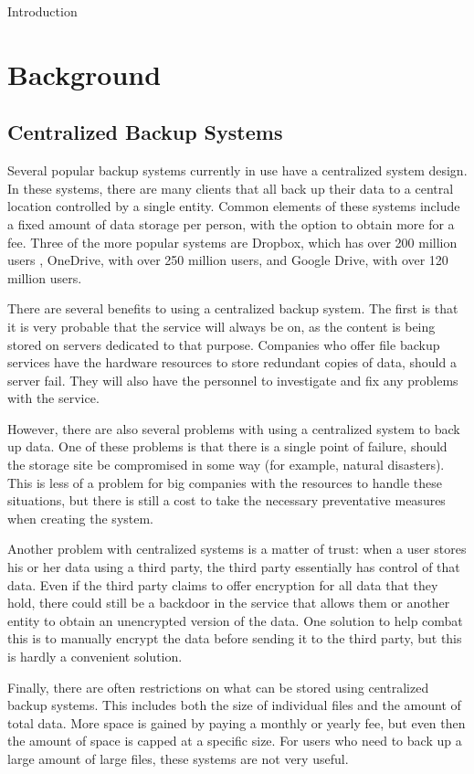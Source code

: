 \documentclass[12pt]{report}
\begin{document}
Introduction


\chapter{Background}
\section{Centralized Backup Systems}
Several popular backup systems currently in use have a centralized system design. In these systems, there are many clients that all back up their data to a central location controlled by a single entity. Common elements of these systems include a fixed amount of data storage per person, with the option to obtain more for a fee. Three of the more popular systems are Dropbox, which has over 200 million users \cite{dropboxusers}, OneDrive, with over 250 million users, and Google Drive, with over 120 million users.

There are several benefits to using a centralized backup system. The first is that it is very probable that the service will always be on, as the content is being stored on servers dedicated to that purpose. Companies who offer file backup services have the hardware resources to store redundant copies of data, should a server fail. They will also have the personnel to investigate and fix any problems with the service.

However, there are also several problems with using a centralized system to back up data. One of these problems is that there is a single point of failure, should the storage site be compromised in some way (for example, natural disasters). This is less of a problem for big companies with the resources to handle these situations, but there is still a cost to take the necessary preventative measures when creating the system.

Another problem with centralized systems is a matter of trust: when a user stores his or her data using a third party, the third party essentially has control of that data. Even if the third party claims to offer encryption for all data that they hold, there could still be a backdoor in the service that allows them or another entity to obtain an unencrypted version of the data. One solution to help combat this is to manually encrypt the data before sending it to the third party, but this is hardly a convenient solution.

Finally, there are often restrictions on what can be stored using centralized backup systems. This includes both the size of individual files and the amount of total data. More space is gained by paying a monthly or yearly fee, but even then the amount of space is capped at a specific size. For users who need to back up a large amount of large files, these systems are not very useful.
\end{document}
